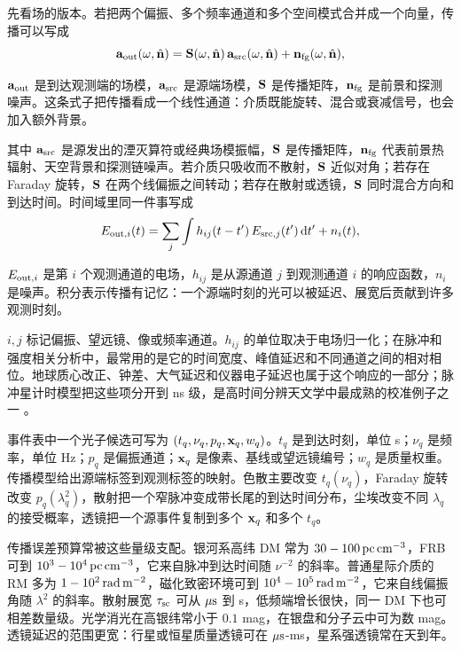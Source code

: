 先看场的版本。若把两个偏振、多个频率通道和多个空间模式合并成一个向量，传播可以写成
\begin{equation}
  {\bf a}_{\rm out}(\omega,\hat{\bf n})
  =
  {\bf S}(\omega,\hat{\bf n})\,{\bf a}_{\rm src}(\omega,\hat{\bf n})
  +{\bf n}_{\rm fg}(\omega,\hat{\bf n}) ,
  \label{eq:ch14-channel-frequency}
\end{equation}
\begin{formulaexplain}[公式 (14.1) 解读]
\({\bf a}_{\rm out}\) 是到达观测端的场模，\({\bf a}_{\rm src}\) 是源端场模，\({\bf S}\) 是传播矩阵，\({\bf n}_{\rm fg}\) 是前景和探测噪声。这条式子把传播看成一个线性通道：介质既能旋转、混合或衰减信号，也会加入额外背景。
\end{formulaexplain}
其中 \({\bf a}_{\rm src}\) 是源发出的湮灭算符或经典场模振幅，\({\bf S}\) 是传播矩阵，\({\bf n}_{\rm fg}\) 代表前景热辐射、天空背景和探测链噪声。若介质只吸收而不散射，\({\bf S}\) 近似对角；若存在 Faraday 旋转，\({\bf S}\) 在两个线偏振之间转动；若存在散射或透镜，\({\bf S}\) 同时混合方向和到达时间。时间域里同一件事写成
\begin{equation}
  E_{{\rm out},i}(t)
  =
  \sum_j\int h_{ij}(t-t')\,E_{{\rm src},j}(t')\,{\rm d}t'
  + n_i(t) ,
  \label{eq:ch14-channel-time}
\end{equation}
\begin{formulaexplain}[公式 (14.2) 解读]
\(E_{{\rm out},i}\) 是第 \(i\) 个观测通道的电场，\(h_{ij}\) 是从源通道 \(j\) 到观测通道 \(i\) 的响应函数，\(n_i\) 是噪声。积分表示传播有记忆：一个源端时刻的光可以被延迟、展宽后贡献到许多观测时刻。
\end{formulaexplain}
\(i,j\) 标记偏振、望远镜、像或频率通道。\(h_{ij}\) 的单位取决于电场归一化；在脉冲和强度相关分析中，最常用的是它的时间宽度、峰值延迟和不同通道之间的相对相位。地球质心改正、钟差、大气延迟和仪器电子延迟也属于这个响应的一部分；脉冲星计时模型把这些项分开到 ns 级，是高时间分辨天文学中最成熟的校准例子之一 \citep{2006MNRAS.372.1549E}。

事件表中一个光子候选可写为 \((t_q,\nu_q,p_q,{\bf x}_q,w_q)\)。\(t_q\) 是到达时刻，单位 s；\(\nu_q\) 是频率，单位 Hz；\(p_q\) 是偏振通道；\({\bf x}_q\) 是像素、基线或望远镜编号；\(w_q\) 是质量权重。传播模型给出源端标签到观测标签的映射。色散主要改变 \(t_q(\nu_q)\)，Faraday 旋转改变 \(p_q(\lambda_q^2)\)，散射把一个窄脉冲变成带长尾的到达时间分布，尘埃改变不同 \(\lambda_q\) 的接受概率，透镜把一个源事件复制到多个 \({\bf x}_q\) 和多个 \(t_q\)。

传播误差预算常被这些量级支配。银河系高纬 DM 常为 \(30-100\,{\rm pc\,cm^{-3}}\)，FRB 可到 \(10^3-10^4\,{\rm pc\,cm^{-3}}\)，它来自脉冲到达时间随 \(\nu^{-2}\) 的斜率。普通星际介质的 RM 多为 \(1-10^2\,{\rm rad\,m^{-2}}\)，磁化致密环境可到 \(10^4-10^5\,{\rm rad\,m^{-2}}\)，它来自线偏振角随 \(\lambda^2\) 的斜率。散射展宽 \(\tau_{\rm sc}\) 可从 \(\mu{\rm s}\) 到 s，低频端增长很快，同一 DM 下也可相差数量级。光学消光在高银纬常小于 \(0.1\) mag，在银盘和分子云中可为数 mag。透镜延迟的范围更宽：行星或恒星质量透镜可在 \(\mu{\rm s}\)-ms，星系强透镜常在天到年。


